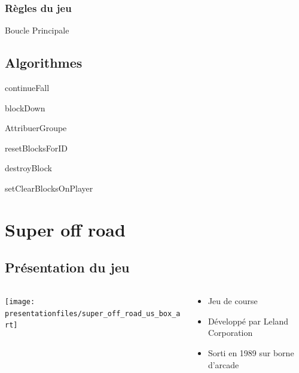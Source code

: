 \documentclass[10pt,dvipsnames,final]{beamer}
\newcommand{\midcolumn}[2]{
\begin{columns}
	\begin{column}{0.5\textwidth}
		#1
	\end{column}
	\begin{column}{0.5\textwidth}
		#2
	\end{column}
\end{columns}
}
\begin{document}
\subsubsection{Règles du jeu}

\begin{frame}[allowframebreaks]{Boucle Principale}

\end{frame}

\subsection{Algorithmes}

\begin{frame}{continueFall}

\end{frame}

\begin{frame}{blockDown}

\end{frame}

\begin{frame}[allowframebreaks]{AttribuerGroupe}

\end{frame}

\begin{frame}{resetBlocksForID}

\end{frame}

\begin{frame}{destroyBlock}

\end{frame}

\begin{frame}{setClearBlocksOnPlayer}

\end{frame}

\section{Super off road}

\subsection{Présentation du jeu}

\begin{frame}
\midcolumn{\texttt{[image: presentationfiles/super\_off\_road\_us\_box\_art]}}{
\begin{itemize}
	\item Jeu de course
	\item Développé par Leland Corporation
	\item Sorti en 1989 sur borne d'arcade
\end{itemize}
}
\end{frame}
\end{document}
